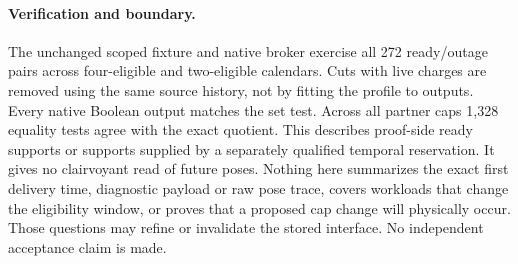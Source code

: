 \documentclass{article}
\begin{document}
\paragraph{Verification and boundary.}
The unchanged scoped fixture and native broker exercise all 272
ready/outage pairs across four-eligible and two-eligible calendars.
Cuts with live charges are removed using the same source history,
not by fitting the profile to outputs. Every native Boolean output
matches the set test. Across all partner caps 1,328 equality tests
agree with the exact quotient. This describes proof-side ready
supports or supports supplied by a separately qualified temporal
reservation. It gives no clairvoyant read of future poses. Nothing
here summarizes the exact first delivery time, diagnostic payload
or raw pose trace, covers workloads that change the eligibility
window, or proves that a proposed cap change will physically
occur. Those questions may refine or invalidate the stored
interface. No independent acceptance claim is made.
\end{document}
